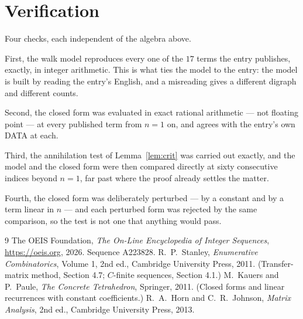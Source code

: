 \documentclass[11pt,a4paper]{article}
\theoremstyle{plain}
\theoremstyle{definition}
\begin{document}
\section{Verification}

Four checks, each independent of the algebra above.

First, the walk model reproduces every one of the $17$ terms the entry publishes,
exactly, in integer arithmetic. This is what ties the model to the entry: the model is built
by reading the entry's English, and a misreading gives a different digraph and different
counts.

Second, the closed form was evaluated in exact rational arithmetic --- not floating point ---
at every published term from $n=1$ on, and agrees with the entry's own DATA at each.

Third, the annihilation test of Lemma~\ref{lem:crit} was carried out exactly, and the model
and the closed form were then compared directly at sixty consecutive indices beyond
$n=1$, far past where the proof already settles the matter.

Fourth, the closed form was deliberately perturbed --- by a constant and by a term linear in
$n$ --- and each perturbed form was rejected by the same comparison, so the test is not one
that anything would pass.

\begin{thebibliography}{9}
 The OEIS Foundation, \emph{The On-Line Encyclopedia of Integer
Sequences}, \url{https://oeis.org}, 2026. Sequence A223828.
 R.~P.~Stanley, \emph{Enumerative Combinatorics}, Volume 1, 2nd ed.,
Cambridge University Press, 2011. (Transfer-matrix method, Section 4.7; $C$-finite sequences,
Section 4.1.)
 M.~Kauers and P.~Paule, \emph{The Concrete Tetrahedron}, Springer, 2011.
(Closed forms and linear recurrences with constant coefficients.)
 R.~A.~Horn and C.~R.~Johnson, \emph{Matrix Analysis}, 2nd ed., Cambridge
University Press, 2013.
\end{thebibliography}
\end{document}
